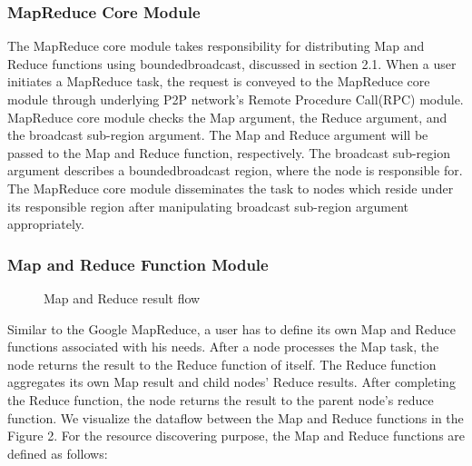 \documentclass{acm_proc_article-sp}
\begin{document}
\subsubsection{MapReduce Core Module}
The MapReduce core module takes responsibility for distributing Map and Reduce functions using boundedbroadcast, discussed in section 2.1. 
When a user initiates a MapReduce task, the request is conveyed to the MapReduce core module through underlying P2P network's Remote Procedure Call(RPC) module. 
MapReduce core module checks the Map argument, the Reduce argument, and the broadcast sub-region argument. 
The Map and Reduce argument will be passed to the Map and Reduce function, respectively. 
The broadcast sub-region argument describes a boundedbroadcast region, where the node is responsible for. 
The MapReduce core module disseminates the task to nodes which reside under its responsible region after manipulating broadcast sub-region argument appropriately.
\subsubsection{Map and Reduce Function Module}
\begin{figure}
\centering
{}
\caption{Map and Reduce result flow}
\end{figure}
Similar to the Google MapReduce, a user has to define its own Map and Reduce functions associated with his needs. 
After a node processes the Map task, the node returns the result to the Reduce function of itself.
The Reduce function aggregates its own Map result and child nodes' Reduce results. 
After completing the Reduce function, the node returns the result to the parent node's reduce function.
We visualize the dataflow between the Map and Reduce functions in the Figure 2.
For the resource discovering purpose, the Map and Reduce functions are defined as follows:
\end{document}

